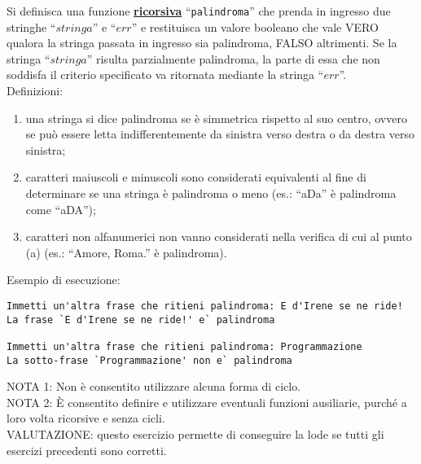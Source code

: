 
Si definisca una funzione \underline{{\bf ricorsiva}} ``{\tt palindroma}''
che prenda in ingresso due stringhe ``$stringa$'' e ``$err$'' e
restituisca un valore booleano che vale VERO qualora la stringa passata
in ingresso sia palindroma, FALSO altrimenti. Se la stringa ``$stringa$'' risulta
parzialmente palindroma, la parte di essa che non soddisfa il criterio
specificato va ritornata mediante la stringa ``$err$''.\\ 

Definizioni:
\begin{enumerate}
\item una stringa si dice palindroma se \`e simmetrica rispetto al suo centro,
ovvero se pu\`o essere letta indifferentemente da sinistra verso destra o
da destra verso sinistra;
\item caratteri maiuscoli e minuscoli sono considerati equivalenti al fine di
determinare se una stringa \`e palindroma o meno (es.: ``aDa'' \`e palindroma come
``aDA'');
\item caratteri non alfanumerici non vanno considerati nella verifica di cui al
punto (a) (es.: ``Amore, Roma.'' \`e palindroma).
\end{enumerate}

Esempio di esecuzione:
\begin{verbatim}
Immetti un'altra frase che ritieni palindroma: E d'Irene se ne ride!
La frase `E d'Irene se ne ride!' e` palindroma

Immetti un'altra frase che ritieni palindroma: Programmazione
La sotto-frase `Programmazione' non e` palindroma
\end{verbatim}


NOTA 1:
Non \`e consentito utilizzare alcuna forma di ciclo.\\

NOTA 2:
\`E consentito definire e utilizzare eventuali funzioni ausiliarie,
purch\'e a loro volta ricorsive e senza cicli.\\ 

VALUTAZIONE:
questo esercizio permette di conseguire la lode se tutti gli esercizi precedenti sono corretti.
